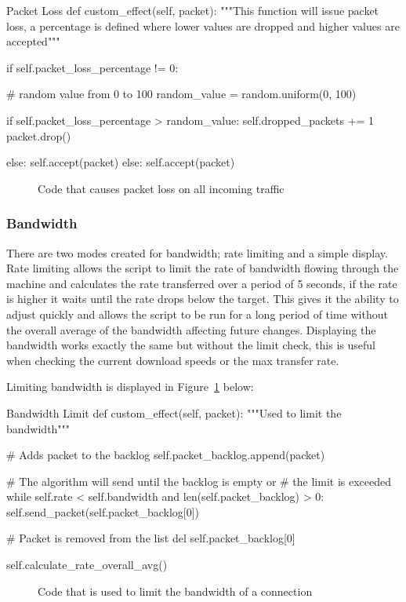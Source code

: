 \begin{Code}{Packet Loss}
def custom_effect(self, packet):
        """This function will issue packet loss,
           a percentage is defined where lower 
           values are dropped and higher values are accepted"""

        if self.packet_loss_percentage != 0:

            # random value from 0 to 100
            random_value = random.uniform(0, 100)

            if self.packet_loss_percentage > random_value:
                self.dropped_packets += 1
                packet.drop()

            else:
                self.accept(packet)
        else:
            self.accept(packet)
\end{Code}
\begin{figure}[h]
	\caption{Code that causes packet loss on all incoming traffic}
\end{figure}

\subsubsection{Bandwidth}
There are two modes created for bandwidth; rate limiting and a simple display. Rate limiting allows the script to limit the rate of bandwidth flowing through the machine and calculates the rate transferred over a period of 5 seconds, if the rate is higher it waits until the rate drops below the target. This gives it the ability to adjust quickly and allows the script to be run for a long period of time without the overall average of the bandwidth affecting future changes. Displaying the bandwidth works exactly the same but without the limit check, this is useful when checking the current download speeds or the max transfer rate.

Limiting bandwidth is displayed in Figure~\ref{ref:BandwidthCode} below:

\begin{Code}{Bandwidth Limit}
def custom_effect(self, packet):
	"""Used to limit the bandwidth"""

	# Adds packet to the backlog
	self.packet_backlog.append(packet)
	
	# The algorithm will send until the backlog is empty or 
	# the limit is exceeded
	while self.rate < self.bandwidth and len(self.packet_backlog) > 0:
		self.send_packet(self.packet_backlog[0])
            
		# Packet is removed from the list
		del self.packet_backlog[0]
			
		self.calculate_rate_overall_avg()
\end{Code}
\begin{figure}[h]
	\caption{Code that is used to limit the bandwidth of a connection}
	\label{ref:BandwidthCode}
\end{figure}


